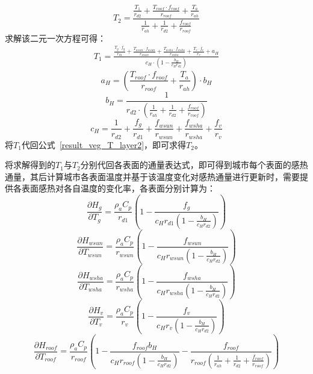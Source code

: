 %
\begin{equation}\label{result_veg_T_layer2}
    T_{2} = \frac{\frac{T_{1}}{r_{d2}} + \frac{T_{roof} \cdot f_{roof}}{r_{roof}} + \frac{T_a}{r_{ah}}}{\frac{1}{r_{ah}} + \frac{1}{r_{d2}} + \frac{f_{roof}}{r_{roof}}}
\end{equation}
求解该二元一次方程可得：
\begin{equation}
    \begin{split}
         T_{1} = 
         \frac{\frac{T_{g} \cdot f_{g}}{r_{d1}} + \frac{T_{wsun} \cdot f_{wsun}}{r_{wsun}} + \frac{T_{wsha} \cdot f_{wsha}}{r_{wsha}} + \frac{T_{v} \cdot f_{v}}{r_{v}} + a_{H}}{c_{H} \cdot \left( 1 - \frac{b_H}{c_{H} r_{d2}} \right)}
    \end{split}
\end{equation}
%
\begin{equation}
    a_{H} = \left(\frac{T_{roof} \cdot f_{roof}}{r_{roof}} + \frac{T_a}{r_{ah}}\right) \cdot b_{H}
\end{equation}
%
\begin{equation}
    b_{H} = \frac{1}{r_{d2} \cdot \left(\frac{1}{r_{ah}} + \frac{1}{r_{d2}} + \frac{f_{roof}}{r_{roof}} \right)}
\end{equation}
%
\begin{equation}
    c_{H} = \frac{1}{r_{d2}} + \frac{f_{g}}{r_{d1}} + \frac{f_{wsun}}{r_{wsun}} + \frac{f_{wsha}}{r_{wsha}} + \frac{f_v}{r_{v}}
\end{equation}
将$T_{1}$代回公式~\ref{result_veg_T_layer2}，即可求得$T_{2}$。

将求解得到的$T_{1}$与$T_{2}$分别代回各表面的通量表达式，即可得到城市每个表面的感热通量，其后计算城市各表面温度并基于该温度变化对感热通量进行更新时，需要提供各表面感热对各自温度的变化率，各表面分别计算为：
\begin{equation}
\frac{\partial H_{g}}{\partial T_{g}} = \frac{\rho _a C_p}{r_{d1}} \left(1-\frac{f_g}{c_{H} r_{d1} \left(1-\frac{b_H}{c_{H} r_{d2}}\right)}\right)
\end{equation}
%
\begin{equation}
\frac{\partial H_{wsun}}{\partial T_{wsun}} = \frac{\rho _a C_p}{r_{wsun}} \left(1-\frac{f_{wsun}}{c_{H} r_{wsun} \left(1-\frac{b_H}{c_{H} r_{d2}}\right)}\right)
\end{equation}
%
\begin{equation}
\frac{\partial H_{wsha}}{\partial T_{wsha}} = \frac{\rho _a C_p}{r_{wsha}} \left(1-\frac{f_{wsha}}{c_{H} r_{wsha} \left(1-\frac{b_H}{c_{H} r_{d2}}\right)}\right)
\end{equation}
%
\begin{equation}
\frac{\partial H_{v}}{\partial T_{v}} = \frac{\rho _a C_p}{r_{v}} \left(1-\frac{f_{v}}{c_{H} r_{v} \left(1-\frac{b_H}{c_{H} r_{d2}}\right)}\right)
\end{equation}
%
\begin{equation}
\frac{\partial H_{roof}}{\partial T_{roof}} = \frac{\rho _a C_p}{r_{roof}} \left(1-\frac{f_{roof} b_{H}}{c_{H} r_{roof} \left(1-\frac{b_H}{c_{H} r_{d2}}\right)}-\frac{f_{roof}}{r_{roof}\left(\frac{1}{r_{ah}}+\frac{1}{r_{d2}}+\frac{f_{roof}}{r_{roof}}\right)}\right)
\end{equation}

